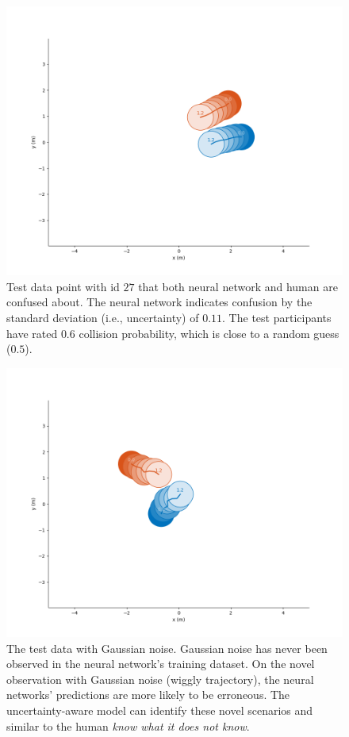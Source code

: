 \begin{figure}[t]
  \centering
  \includegraphics[width=\linewidth]{figures/unceratin_data.png}
  \caption{Test data point with id $27$ that both neural network and human are confused about. The neural network indicates confusion by the standard deviation (i.e., uncertainty) of $0.11$. The test participants have rated  $0.6$ collision probability, which is close to a random guess ($0.5$).}
  \label{fig:nn-uncertain-data}
\end{figure}

\begin{figure}[t]
  \centering
  \includegraphics[width=\linewidth]{figures/noise_data.png}
  \caption{The test data with Gaussian noise. Gaussian noise has never been observed in the neural network's training dataset. On the novel observation with Gaussian noise (wiggly trajectory), the neural networks' predictions are more likely to be erroneous. The uncertainty-aware model can identify these novel scenarios and similar to the human \textit{know what it does not know}.}
  \label{fig:noise-data}
\end{figure}

